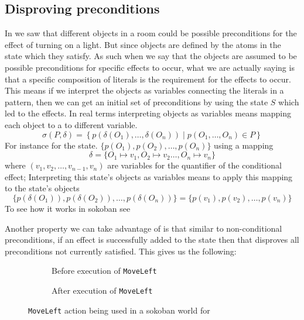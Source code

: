 \documentclass[\master/Master.tex]{subfiles}
\begin{document}
\subsection{Disproving preconditions}
In   we saw that different objects in a room could be possible preconditions for the effect of turning on a light. But since 
objects are defined by the atoms in the state which they satisfy. As such when we say that the objects are assumed to be possible preconditions for specific effects to occur, what we are actually saying is that a specific composition of literals is the requirement for the effects to occur.
This means if we interpret the objects as variables connecting the literals in a pattern, then we can get an initial set of preconditions by using the state $S$ which led to the effects. In real terms interpreting objects as variables means mapping each object 
to a to different variable.
\begin{equation}\label{eq:ca:substitution}
	\sigma(P,\delta) =  \left\{p\left(\delta(O_1),\ldots,\delta(O_n) \right) \mid p(O_1,\ldots,O_n) \in P  \right\}
\end{equation}
For instance for the state.
$\{ p(O_1), p(O_2),\ldots,p(O_n)\}$ using a mapping
\begin{equation*}
\delta = \{O_1 \mapsto v_1, O_2 \mapsto v_2 \ldots, O_n \mapsto v_n\}
\end{equation*}
where $(v_1, v_2,\dots,v_{n-1},v_n)$ are variables for the quantifier of the conditional effect; Interpreting this state's objects as variables means to apply this mapping to the state's objects
\begin{equation*}
\{ p(\delta(O_1)), p(\delta(O_2)),\ldots,p(\delta(O_n))\} = \{ p(v_1), p(v_2),\ldots,p(v_n)\}
\end{equation*}
To see how it works in sokoban see 

Another property we can take advantage of is that similar to non-conditional preconditions, if an effect is successfully added to the state then that disproves all preconditions not currently satisfied.
This gives us the following:


\begin{figure}
    \hspace*{0.1\textwidth}%
    \begin{subfigure}{0.35\textwidth}
        \centering
        \resizebox{\linewidth}{!}{}
        \caption{Before execution of \texttt{MoveLeft}}
    \end{subfigure}%
    \hspace*{0.1\textwidth}%
    \begin{subfigure}{0.35\textwidth}
        \centering
        \resizebox{\linewidth}{!}{}
        \caption{After execution of \texttt{MoveLeft}}
    \end{subfigure}
    \hspace*{0.1\textwidth}
	\caption{\label{fig:ca:sokoban-moveleft-action}\texttt{MoveLeft} action being used in a sokoban world for  }

\end{figure}
\end{document}
